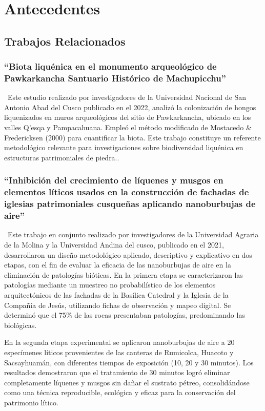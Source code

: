 \chapter{Antecedentes}

\section{Trabajos Relacionados}
\subsection{“Biota liquénica en el monumento arqueológico de Pawkarkancha Santuario Histórico de Machupicchu”}\
Este estudio realizado por investigadores de la Universidad Nacional de San Antonio Abad del Cusco publicado en el 2022, analizó la colonización de hongos liquenizados en muros arqueológicos del sitio de Pawkarkancha, ubicado en los valles Q’esqa y Pampacahuana. Empleó el método modificado de Mostacedo \& Fredericksen (2000) para cuantificar la biota. Este trabajo constituye un referente metodológico relevante para investigaciones sobre biodiversidad liquénica en estructuras patrimoniales de piedra.\cite{molina2022biota}.
\subsection{“Inhibición del crecimiento de líquenes y musgos en elementos líticos usados en la construcción de fachadas de iglesias patrimoniales cusqueñas aplicando nanoburbujas de aire”}\
Este trabajo en conjunto realizado por investigadores de la Universidad Agraria de la Molina y la Universidad Andina del cusco, publicado en el 2021, desarrollaron un diseño metodológico aplicado, descriptivo y explicativo en dos etapas, con el fin de evaluar la eficacia de las nanoburbujas de aire en la eliminación de patologías bióticas. En la primera etapa se caracterizaron las patologías mediante un muestreo no probabilístico de los elementos arquitectónicos de las fachadas de la Basílica Catedral y la Iglesia de la Compañía de Jesús, utilizando fichas de observación y mapeo digital. Se determinó que el 75\% de las rocas presentaban patologías, predominando las biológicas.

En la segunda etapa experimental se aplicaron nanoburbujas de aire a 20 especímenes líticos provenientes de las canteras de Rumicolca, Huacoto y Sacsayhuamán, con diferentes tiempos de exposición (10, 20 y 30 minutos). Los resultados demostraron que el tratamiento de 30 minutos logró eliminar completamente líquenes y musgos sin dañar el sustrato pétreo, consolidándose como una técnica reproducible, ecológica y eficaz para la conservación del patrimonio lítico.\cite[]{valverde2021inhibicion}
